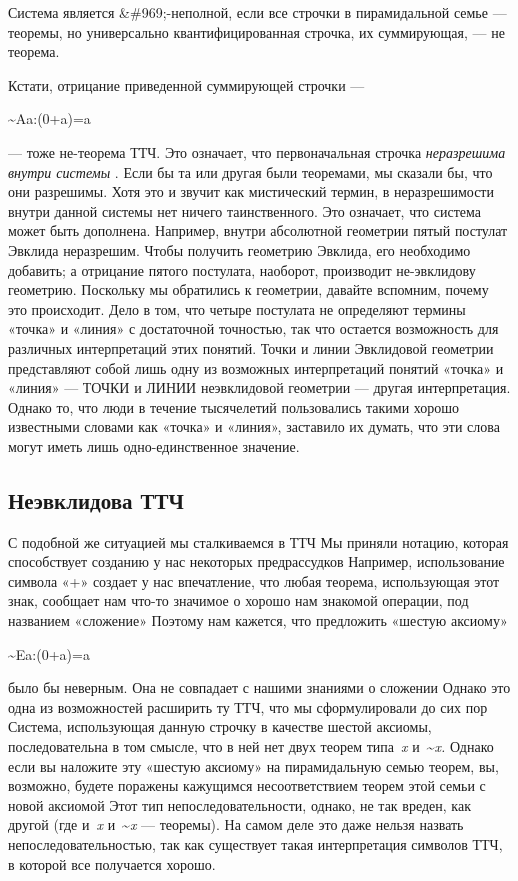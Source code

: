 \documentclass[../main.tex]{subfiles}
\begin{document}
Система является \&\#969;-неполной, если все строчки в пирамидальной семье --- теоремы, но универсально квантифицированная строчка, их суммирующая, --- не теорема.

Кстати, отрицание приведенной суммирующей строчки ---

\textasciitilde Aa:(0+a)=a

--- тоже не-теорема ТТЧ. Это означает, что первоначальная строчка \emph{неразрешима внутри системы} . Если бы та или другая были теоремами, мы сказали бы, что они разрешимы. Хотя это и звучит как мистический термин, в неразрешимости внутри данной системы нет ничего таинственного. Это означает, что система может быть дополнена. Например, внутри абсолютной геометрии пятый постулат Эвклида неразрешим. Чтобы получить геометрию Эвклида, его необходимо добавить; а отрицание пятого постулата, наоборот, производит не-эвклидову геометрию. Поскольку мы обратились к геометрии, давайте вспомним, почему это происходит. Дело в том, что четыре постулата не определяют термины «точка» и «линия» с достаточной точностью, так что остается возможность для различных интерпретаций этих понятий. Точки и линии Эвклидовой геометрии представляют собой лишь одну из возможных интерпретаций понятий «точка» и «линия» --- ТОЧКИ и ЛИНИИ неэвклидовой геометрии --- другая интерпретация. Однако то, что люди в течение тысячелетий пользовались такими хорошо известными словами как «точка» и «линия», заставило их думать, что эти слова могут иметь лишь одно-единственное значение.


\subsection{Неэвклидова ТТЧ}

С подобной же ситуацией мы сталкиваемся в ТТЧ Мы приняли нотацию, которая способствует созданию у нас некоторых предрассудков Например, использование символа «+» создает у нас впечатление, что любая теорема, использующая этот знак, сообщает нам что-то значимое о хорошо нам знакомой операции, под названием «сложение» Поэтому нам кажется, что предложить «шестую аксиому»

\textasciitilde Ea:(0+a)=a

было бы неверным. Она не совпадает с нашими знаниями о сложении Однако это одна из возможностей расширить ту ТТЧ, что мы сформулировали до сих пор Система, использующая данную строчку в качестве шестой аксиомы, последовательна в том смысле, что в ней нет двух теорем типа~\emph{x} и~\textasciitilde{}\emph{x.} Однако если вы наложите эту «шестую аксиому» на пирамидальную семью теорем, вы, возможно, будете поражены кажущимся несоответствием теорем этой семьи с новой аксиомой Этот тип непоследовательности, однако, не так вреден, как другой (где и~\emph{x} и~\textasciitilde{}\emph{x} --- теоремы). На самом деле это даже нельзя назвать непоследовательностью, так как существует такая интерпретация символов ТТЧ, в которой все получается хорошо.
\end{document}
